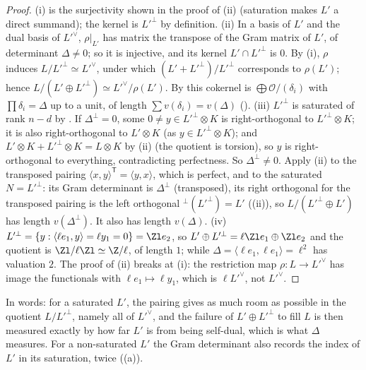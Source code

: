 \begin{proof}
(i) is the surjectivity shown in the proof of (ii) (saturation makes $L'$ a direct summand); the kernel is $L'^\perp$ by
definition.
(ii) In a basis of $L'$ and the dual basis of $L'^\vee$, $\rho|_{L'}$ has matrix the transpose of the Gram matrix of $L'$, of determinant $\Delta\ne0$; so it is
injective, and its kernel $L'\cap L'^\perp$ is $0$. By (i), $\rho$ induces $L/L'^\perp\simeq L'^\vee$, under which $(L'+L'^\perp)/L'^\perp$ corresponds to
$\rho(L')$; hence $L/(L'\oplus L'^\perp)\simeq L'^\vee/\rho(L')$. By  this cokernel is $\bigoplus\mathcal O/(\delta_i)$ with $\prod\delta_i=\Delta$ up to a unit,
of length $\sum v(\delta_i)=v(\Delta)$ ().
(iii) $L'^\perp$ is saturated of rank $n-d$ by . If $\Delta^\perp=0$, some $0\ne y\in L'^\perp\otimes K$ is right-orthogonal to
$L'^\perp\otimes K$; it is also right-orthogonal to $L'\otimes K$ (as $y\in L'^\perp\otimes K$); and $L'\otimes K+L'^\perp\otimes K=L\otimes K$ by (ii) (the quotient is
torsion), so $y$ is right-orthogonal to everything, contradicting perfectness. So $\Delta^\perp\ne0$. Apply (ii) to the transposed pairing
$\langle x,y\rangle^{\mathsf T}=\langle y,x\rangle$, which is perfect, and to the saturated $N=L'^\perp$: its Gram determinant is $\Delta^\perp$ (transposed), its right orthogonal
for the transposed pairing is the left orthogonal ${}^\perp(L'^\perp)=L'$ ((ii)), so $L/(L'^\perp\oplus L')$ has length
$v(\Delta^\perp)$. It also has length $v(\Delta)$.
(iv) $L'^\perp=\{y:\langle\ell e_1,y\rangle=\ell y_1=0\}=\Zl e_2$, so $L'\oplus L'^\perp=\ell\Zl e_1\oplus\Zl e_2$ and the quotient is $\Zl/\ell\Zl\simeq\Z/\ell$, of
length $1$; while $\Delta=\langle\ell e_1,\ell e_1\rangle=\ell^2$ has valuation $2$. The proof of (ii) breaks at (i): the restriction map
$\rho\colon L\to L'^\vee$ has image the functionals with $\ell e_1\mapsto\ell y_1$, which is $\ell L'^\vee$, not $L'^\vee$.
\end{proof}

In words: for a saturated $L'$, the pairing gives as much room as possible in the quotient $L/L'^\perp$, namely all of $L'^\vee$, and the failure
of $L'\oplus L'^\perp$ to fill $L$ is then measured exactly by how far $L'$ is from being self-dual, which is what $\Delta$ measures. For a
non-saturated $L'$ the Gram determinant also records the index of $L'$ in its saturation, twice ((a)).

